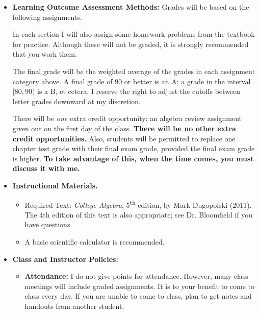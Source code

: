 \documentclass{article}
\begin{document}
\begin{itemize}
\item \textbf{Learning Outcome Assessment Methods:} Grades will be based on the following assignments.
In each section I will also assign some homework problems from the textbook for practice. Although these will not be graded, it is strongly recommended that you work them.

The final grade will be the weighted average of the grades in each assignment category above. A final grade of 90 or better is an A; a grade in the interval $[80,90)$ is a B, et cetera. I reserve the right to adjust the cutoffs between letter grades downward at my discretion.

There will be \emph{one} extra credit opportunity: an algebra review assignment given out on the first day of the class. \textbf{There will be no other extra credit opportunities.} Also, students will be permitted to replace one chapter test grade with their final exam grade, provided the final exam grade is higher. \textbf{To take advantage of this, when the time comes, you must discuss it with me.}


\item \textbf{Instructional Materials.} 
\begin{itemize}
\item Required Text: \emph{College Algebra}, 5\textsuperscript{th} edition, by Mark Dugopolski (2011). The 4th edition of this text is also appropriate; see Dr. Bloomfield if you have questions.
\item A basic scientific calculator is recommended.
\end{itemize}

\item \textbf{Class and Instructor Policies:}
\begin{itemize}
\item \textbf{Attendance:} I do not give points for attendance. However, many class meetings will include graded assignments. It is to your benefit to come to class every day. If you are unable to come to class, plan to get notes and handouts from another student.


\end{itemize}
\end{itemize}
\end{document}
